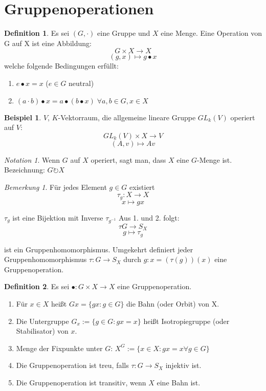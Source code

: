 \documentclass[12pt]{scrartcl}%
\theoremstyle{definition}
\newtheorem*{defn}{Definition}
\newtheorem{ex}{Beispiel}
\theoremstyle{remark}
\newtheorem*{notation}{Notation}
\newtheorem*{nb}{Bemerkung}
\begin{document}
\section{Gruppenoperationen}
	\begin{defn}
	Es sei $(G, \cdot)$ eine Gruppe und $X$ eine Menge. Eine Operation von G auf X ist eine Abbildung:
	$$G \times X \rightarrow X$$
	$$(g,x) \mapsto g\bullet x$$
	welche folgende Bedingungen erfüllt:
	\begin{enumerate}
		\item $e \bullet x = x$ ($e\in G$ neutral)
		\item $(a\cdot b)\bullet x = a\bullet (b\bullet x)\;\forall a,b\in G, x\in X$
	\end{enumerate}
	\end{defn}
	
	\begin{ex}
	$V$, $K$-Vektorraum, die allgemeine lineare Gruppe $GL_k(V)$ operiert auf $V$:
	$$GL_k(V) \times X \rightarrow V$$
	$$(A,v)\mapsto Av$$
	\end{ex}

	\begin{notation}
	Wenn $G$ auf $X$ operiert, sagt man, dass $X$ eine $G$-Menge ist. Bezeichnung: $G\circlearrowright X$
	\end{notation}

	\begin{nb}
	Für jedes Element $g\in G$ existiert
	$$\tau_g: X \rightarrow X$$
	$$x \mapsto gx$$
	\end{nb}
	
	$\tau_g$ ist eine Bijektion mit Inverse $\tau_{g^{-1}}$ Aus 1. und 2. folgt:
	$$\tau G \rightarrow S_X$$
	$$g \mapsto \tau_g$$
	
	ist ein Gruppenhomomorphismus. Umgekehrt definiert jeder Gruppenhomomorphismus $\tau: G \rightarrow S_X$ durch 
	$g: x=(\tau(g))(x)$ eine Gruppenoperation.
	
	\begin{defn} Es sei $\bullet: G \times X \rightarrow X$ eine Gruppenoperation.
	\begin{enumerate}
		\item Für $x\in X$ heißt $Gx=\{ gx : g \in G\}$ die Bahn (oder Orbit) von X. 
		\item Die Untergruppe $G_x:=\{ g\in G : gx=x\}$ heißt Isotropiegruppe (oder Stabilisator) von $x$.
		\item Menge der Fixpunkte unter $G$: $X^G:=\{ x \in X : gx=x \forall g \in G\}$
		\item Die Gruppenoperation ist treu, falls $\tau:G \rightarrow S_X$ injektiv ist.
		\item Die Gruppenoperation ist transitiv, wenn $X$ eine Bahn ist.
	\end{enumerate}
	\end{defn}
	
\end{document}
